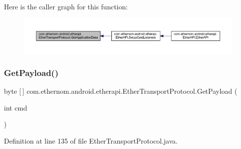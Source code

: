 Here is the caller graph for this function\+:\nopagebreak
\begin{figure}[H]
\begin{center}
\leavevmode
\includegraphics[width=350pt]{classcom_1_1ethernom_1_1android_1_1etherapi_1_1_ether_transport_protocol_adc5e3627f32f692dec5c6b6037fdfe3e_icgraph}
\end{center}
\end{figure}
\mbox{\label{classcom_1_1ethernom_1_1android_1_1etherapi_1_1_ether_transport_protocol_aa7834cb6d0b64e72dc913a5ec1cfcfb8}} 
\subsubsection{\texorpdfstring{Get\+Payload()}{GetPayload()}\hspace{0.1cm}{\footnotesize\ttfamily [1/6]}}
{\footnotesize\ttfamily byte \mbox{[}$\,$\mbox{]} com.\+ethernom.\+android.\+etherapi.\+Ether\+Transport\+Protocol.\+Get\+Payload (\begin{DoxyParamCaption}\item[{int}]{cmd }\end{DoxyParamCaption})}



Definition at line 135 of file Ether\+Transport\+Protocol.\+java.

